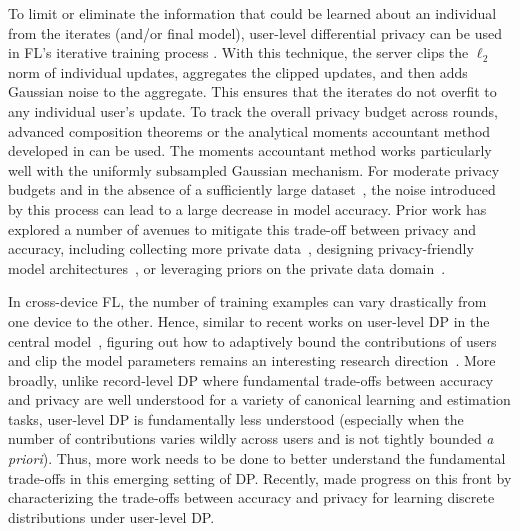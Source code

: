 To limit or eliminate the information that could be learned about an individual from the iterates (and/or final model), user-level differential privacy can be used in FL’s iterative training process \cite{abadi2016deep,mcmahan18dplm,mcmahan2018general,bhowmick2018protection}. With this technique, the server clips the $\ell_2$ norm of individual updates, aggregates the clipped updates, and then adds Gaussian noise to the aggregate. This ensures that the iterates do not overfit to any individual user’s update. To track the overall privacy budget across rounds, advanced composition theorems \cite{DRV10, kairouz2017composition} or the analytical moments accountant method developed in \cite{abadi2016deep,mironov2017renyi, mironov2019r,wang2018subsampled} can be used. The moments accountant method works particularly well with the uniformly subsampled Gaussian mechanism. For moderate privacy budgets and in the absence of a sufficiently large dataset~\cite{ramaswamy2020training}, the noise introduced by this process can lead to a large decrease in model accuracy.  Prior work has explored a number of avenues to mitigate this trade-off between privacy and accuracy, including collecting more private data~\cite{mcmahan18dplm}, designing privacy-friendly model architectures~\cite{papernot2020tempered}, or leveraging priors on the private data domain~\cite{tramer2020differentially}.

In cross-device FL, the number of training examples can vary drastically from one device to the other.
Hence, similar to recent works on user-level DP in the central model~\cite{amin2019bounding}, figuring out how to adaptively bound the contributions of users and clip the model parameters remains an interesting research direction~\cite{thakkar2019differentially, pichapati2019adaclip}. More broadly, unlike record-level DP where fundamental trade-offs between accuracy and privacy are well understood for a variety of canonical learning and estimation tasks, user-level DP is fundamentally less understood (especially when the number of contributions varies wildly across users and is not tightly bounded \textit{a priori}). Thus, more work needs to be done to better understand the fundamental trade-offs in this emerging setting of DP.  Recently, \cite{liu2020learning} made progress on this front by characterizing the trade-offs between accuracy and privacy for learning discrete distributions under user-level DP.

